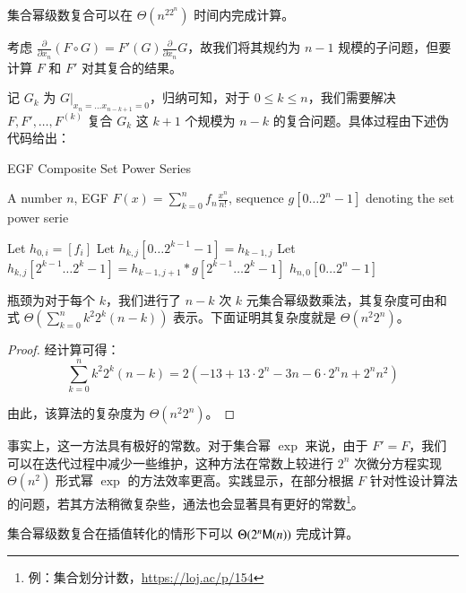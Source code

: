 \begin{theorem} \label{setcomp}
集合幂级数复合可以在 $\Theta(n^22^n)$ 时间内完成计算。
\end{theorem}

考虑 $\frac{\partial}{\partial x_n} (F \circ G) = F'(G)\frac{\partial}{\partial x_n} G$，故我们将其规约为 $n-1$ 规模的子问题，但要计算 $F$ 和 $F'$ 对其复合的结果。

记 $G_k$ 为 $\left. G \right |_{x_n = \dots x_{n-k+1}=0}$，归纳可知，对于 $0\le k\le n$，我们需要解决 $F, F', \dots, F^{(k)}$ 复合 $G_k$ 这 $k+1$ 个规模为 $n-k$ 的复合问题。具体过程由下述伪代码给出：

\begin{breakablealgorithm}
  \caption{EGF Composite Set Power Series}
  \begin{algorithmic}[1]
    \REQUIRE A number $n$, EGF $F(x)=\sum_{k=0}^n f_n \frac{x^n}{n!}$, sequence $g[0\dots 2^n-1]$ denoting the set power serie

      \STATE Let $h_{0,i} = [f_i]$
    \ENDFOR
        \STATE Let $h_{k,j}[0\dots 2^{k-1}-1] = h_{k-1,j}$
        \STATE Let $h_{k,j}[2^{k-1}\dots 2^k-1] = h_{k-1,j+1} * g[2^{k-1}\dots 2^k-1]$
      \ENDFOR
    \ENDFOR
    \RETURN $h_{n,0}[0\dots 2^n-1]$
  \end{algorithmic}
\end{breakablealgorithm}

瓶颈为对于每个 $k$，我们进行了 $n-k$ 次 $k$ 元集合幂级数乘法，其复杂度可由和式 $\Theta \left(\sum_{k=0}^n k^2 2^k (n-k)\right)$ 表示。下面证明其复杂度就是 $\Theta(n^2 2^n)$。

\begin{proof}
经计算可得：
$$
\sum_{k=0}^n k^2 2^k (n-k) = 2(-13 + 13\cdot 2^n - 3n - 6\cdot 2^n n+ 2^n n^2)
$$

由此，该算法的复杂度为 $\Theta(n^2 2^n)$。
\end{proof}

事实上，这一方法具有极好的常数。对于集合幂 $\exp$ 来说，由于 $F'=F$，我们可以在迭代过程中减少一些维护，这种方法在常数上较进行 $2^n$ 次微分方程实现 $\Theta(n^2)$ 形式幂 $\exp$ 的方法效率更高。实践显示，在部分根据 $F$ 针对性设计算法的问题，若其方法稍微复杂些，通法也会显著具有更好的常数\footnote{例：集合划分计数，\url{https://loj.ac/p/154}}。

\begin{lemma}
集合幂级数复合在插值转化的情形下可以 $\Theta(2^n\mathsf M(n))$ 完成计算。
\end{lemma}


